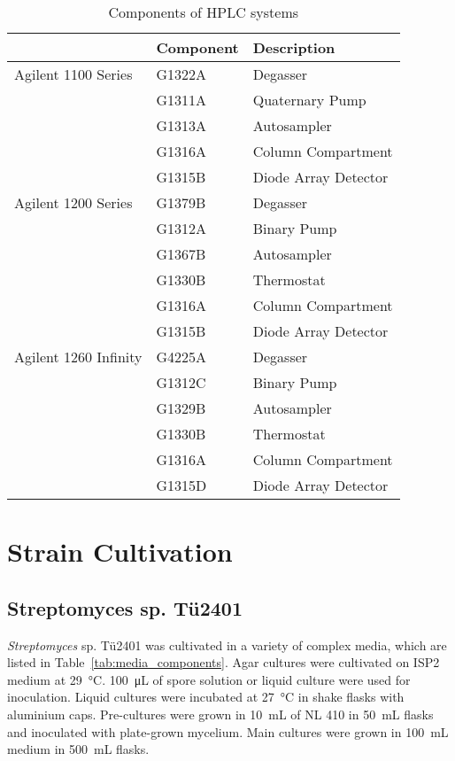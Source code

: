 	\begin{table}[H]
		\caption{Components of HPLC systems}
		\label{tab:HPLCtab}
		\centering
		\begin{tabularx}{\textwidth}{XXX}
			\toprule
							& \textbf{Component}		& \textbf{Description}	\\
			\midrule
			Agilent 1100 Series		&	G1322A		&	Degasser			\\
									&	G1311A		&	Quaternary Pump		\\
									&	G1313A		&	Autosampler			\\
									&	G1316A		&	Column Compartment	\\
									&	G1315B		&	Diode Array Detector	\\
			\midrule
			Agilent 1200 Series		&	G1379B		&	Degasser			\\
									&	G1312A		&	Binary Pump			\\
									&	G1367B		&	Autosampler			\\
									&	G1330B		&	Thermostat			\\
									&	G1316A		&	Column Compartment	\\
									&	G1315B		&	Diode Array Detector	\\
			\midrule
			Agilent 1260 Infinity	&	G4225A		&	Degasser			\\
									&	G1312C		&	Binary Pump			\\
									&	G1329B		&	Autosampler			\\
									&	G1330B		&	Thermostat			\\
									&	G1316A		&	Column Compartment	\\
									&	G1315D		&	Diode Array Detector	\\
			\bottomrule
		\end{tabularx}
	\end{table}


\section{Strain Cultivation} %
\label{sec:strain_cultivation}

	\subsection{Streptomyces sp. T\"u2401} %
	\label{sub:streptomyces_sp_t}
	\emph{Streptomyces} sp. T\"u2401 was cultivated in a variety of complex media, which are listed in Table~\ref{tab:media_components}. Agar cultures were cultivated on ISP2 medium at \SI{29}{\celsius}. \SI{100}{\micro\liter} of spore solution or liquid culture were used for inoculation. Liquid cultures were incubated at \SI{27}{\celsius} in shake flasks with aluminium caps. Pre-cultures were grown in \SI{10}{\milli\liter} of NL 410 in \SI{50}{\milli\liter} flasks and inoculated with plate-grown mycelium. Main cultures were grown in \SI{100}{\milli\liter} medium in \SI{500}{\milli\liter} flasks.


